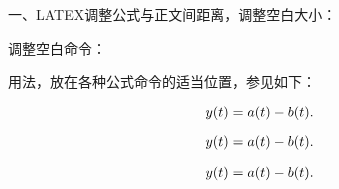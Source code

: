 一、LATEX调整公式与正文间距离，调整空白大小：

 

调整空白命令：

\setlength{\abovedisplayskip}{3pt} %

\setlength{\belowdisplayskip}{3pt}

 

用法，放在各种公式命令的适当位置，参见如下：

 


\begin{equation}

\setlength{\abovedisplayskip}{3pt}

\setlength{\belowdisplayskip}{3pt}

y(t)=a(t)-b(t).

\end{equation}

 


$$

\setlength{\abovedisplayskip}{3pt}

\setlength{\belowdisplayskip}{3pt}

y(t)=a(t)-b(t).

$$

 


\begin{eqnarray}

\setlength{\abovedisplayskip}{3pt}

\setlength{\belowdisplayskip}{3pt}

y(t)=a(t)-b(t).

\end{eqnarray}

 


\vspace{-0.8cm}  %

\setlength{\abovecaptionskip}{-0.2cm}   %

\setlength{\belowcaptionskip}{-1cm}   %